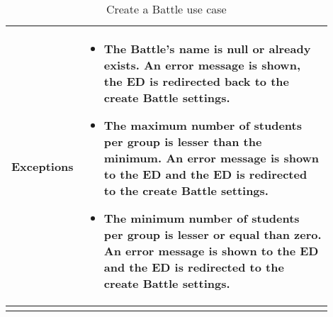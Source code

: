 \begin{center}
\begin{longtable}{|l|p{0.9\linewidth}|}
        \hline
        \textbf{Exceptions}        & \begin{itemize}
                \item The Battle’s name is null or already exists. An error message is shown, the ED is redirected back to the create Battle settings.
                \item The maximum number of students per group is lesser than the minimum.  An error message is shown to the ED and the ED is redirected to the create Battle settings.
                \item The minimum number of students per group is lesser or equal than zero.  An error message is shown to the ED and the ED is redirected to the create Battle settings.    
        \end{itemize}    \\
        \hline
        \caption{Create a Battle use case}
        \label{tab: create_a_Battle_use_case}
    \end{longtable}
\end{center}

